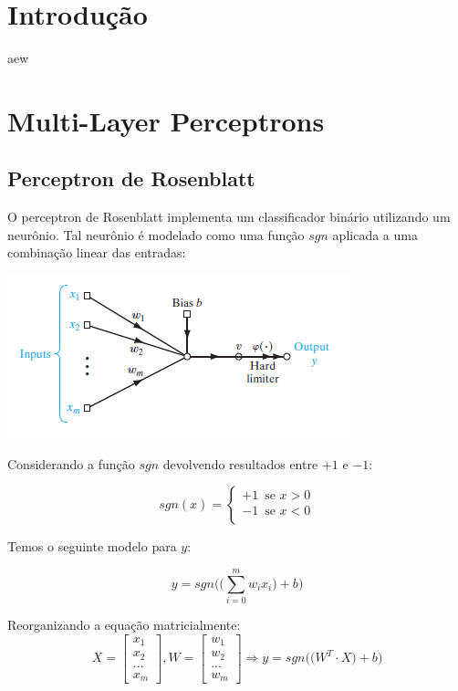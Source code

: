 \documentclass[
	12pt,				%
	oneside,			%
	a4paper,			%
	english,			%
	french,				%
	spanish,			%
	brazil,				%
	]{abntex2}
\begin{document}
\chapter[Introdução]{Introdução}
aew

\chapter{Multi-Layer Perceptrons}


\section{Perceptron de Rosenblatt}
O perceptron de Rosenblatt implementa um classificador bin\'ario utilizando um neur\^onio. Tal neur\^onio \'e modelado como uma fun\c{c}\~ao $sgn$ aplicada a uma combina\c{c}\~ao linear das entradas:

\begin{center}
	\includegraphics[scale=1]{rosenblattperceptron.png}
\end{center} 

Considerando a fun\c{c}\~ao $sgn$ devolvendo resultados entre $+1$ e $-1$:

$$sgn(x) = \begin{cases}
+1 \enspace \text{se } x > 0 \\
-1 \enspace \text{se } x < 0 \\
\end{cases}$$


Temos o seguinte modelo para $y$:

$$ y = sgn\bigg(  \big(\sum_{i=0}^m w_ix_i\big) + b \bigg)$$

Reorganizando a equa\c{c}\~ao matricialmente:
$$ X = \begin{bmatrix}
x_1 \\
x_2 \\
... \\
x_m
\end{bmatrix},
W = \begin{bmatrix}
w_1 \\
w_2 \\
... \\
w_m
\end{bmatrix} \Rightarrow
y = sgn\bigg( \big(W^T\cdot X\big) + b \bigg)$$
\end{document}
